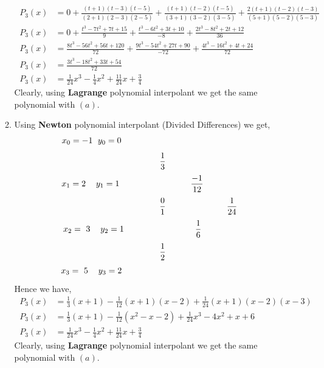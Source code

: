 \documentclass[11pt,twoside]{article}
\begin{document}
\begin{enumerate}[leftmargin=0pt]
\begin{enumerate}
			\begin{align} \nonumber
                             \ P_3(x)  & = 0 + \frac{(t+1)(t-3)(t-5)}{(2+1)(2-3)(2-5)} + 
                             		\frac{(t+1)(t-2)(t-5)}{(3+1)(3-2)(3-5)} + \frac{2(t+1)(t-2)(t-3)}{(5+1)(5-2)(5-3)} \\ \nonumber
			   \ P_3(x)  & = 0 + \frac{t^3-7t^2+7t+15}{9} + \frac{t^3-6t^2+3t+10}{-8} + \frac{2t^3-8t^2+2t+12}{36} \\ \nonumber
			    \ P_3(x)  & =  \frac{8t^3-56t^2+56t+120}{72} + \frac{9t^3-54t^2+27t +90}{-72} +  \frac{4t^3-16t^2+4t+24}{72} \\ \nonumber
			     \ P_3(x)  & =  \frac{3t^3-18t^2+33t+54}{72} \\ \nonumber
			     \ P_3(x)  & = \frac{1}{24}x^3 - \frac{1}{4}x^2 + \frac{11}{24}x + \frac{3}{4} \nonumber
                        	\end{align}
Clearly, using \textbf{Lagrange}  polynomial interpolant we get the same polynomial with $(a)$.
\item  Using \textbf{Newton} polynomial interpolant (Divided Differences) we get,  
			\[x_0 = -1\hskip0.5pc  y_0 = 0 \hskip12pc  \]
						\[\hskip7pc  \frac{1}{3} \hskip5pc\]
			\[x_1 = 2\hskip1pc  y_1 = 1 \hskip7pc   \frac{-1}{12} \hskip4pc\]
						\[ \hskip9pc  \frac{0}{1}  \hskip6pc  \frac{1}{24}\]
			\[x_2 = \ 3\hskip1pc  y_2 = 1 \hskip7pc  \frac{1}{6} \hskip4pc\]
						\[\hskip7pc  \frac{1}{2} \hskip5pc\]
			\[x_3 = \ 5\hskip1pc  y_3 = 2 \hskip12pc \]
	Hence we have,
			\begin{align} \nonumber
			 \ P_3(x) &= \frac{1}{3}(x+1) - \frac{1}{12}(x+1)(x-2) +\frac{1}{24}(x+1)(x-2)(x-3) \\ \nonumber
			 \ P_3(x) &= \frac{1}{3}(x+1) - \frac{1}{12}(x^2 - x - 2) +\frac{1}{24}x^3 - 4x^2 + x + 6\\ \nonumber
			  \ P_3(x) &= \frac{1}{24}x^3 - \frac{1}{4}x^2 +\frac{11}{24}x +\frac{3}{4} \nonumber
			 \end{align}
Clearly, using \textbf{Lagrange}  polynomial interpolant we get the same polynomial with $(a)$.			
\end{enumerate}


\end{enumerate}
\end{document}
